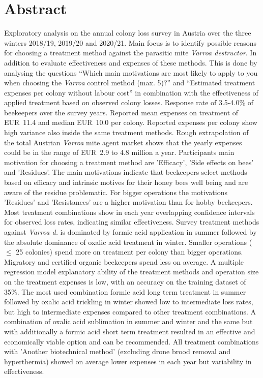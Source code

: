 \chapter*{Abstract}
\label{sec:abstract}
\vspace*{-15mm}

Exploratory analysis on the annual colony loss survey in Austria over the three winters 2018/19, 2019/20 and 2020/21. Main focus is to identify possible reasons for choosing a treatment method against the parasitic mite \textit{Varroa destructor}. In addition to evaluate effectiveness and expenses of these methods. This is done by analysing the questions \enquote{Which main motivations are most likely to apply to you when choosing the \textit{Varroa} control method (max. 5)?} and \enquote{Estimated treatment expenses per colony without labour cost} in combination with the effectiveness of applied treatment based on observed colony losses. Response rate of 3.5-4.0\% of beekeepers over the survey years. Reported mean expenses on treatment of EUR~11.4 and median EUR~10.0 per colony. Reported expenses per colony show high variance also inside the same treatment methods. Rough extrapolation of the total Austrian \textit{Varroa} mite agent market shows that the yearly expenses could be in the range of EUR~2.9 to 4.8 million a year. Participants main motivation for choosing a treatment method are 'Efficacy', 'Side effects on bees' and 'Residues'. The main motivations indicate that beekeepers select methods based on efficacy and intrinsic motives for their honey bees well being and are aware of the residue problematic. For bigger operations the motivations 'Residues' and 'Resistances' are a higher motivation than for hobby beekeepers. Most treatment combinations show in each year overlapping confidence intervals for observed loss rates, indicating similar effectiveness. Survey treatment methods against \textit{Varroa d.} is dominated by formic acid application in summer followed by the absolute dominance of oxalic acid treatment in winter. Smaller operations ($\leq$ 25 colonies) spend more on treatment per colony than bigger operations. Migratory and certified organic beekeepers spend less on average. A multiple regression model explanatory ability of the treatment methods and operation size on the treatment expenses is low, with an accuracy on the training dataset of 35\%. The most used combination formic acid long term treatment in summer followed by oxalic acid trickling in winter showed low to intermediate loss rates, but high to intermediate expenses compared to other treatment combinations. A combination of oxalic acid sublimation in summer and winter and the same but with additionally a formic acid short term treatment resulted in an effective and economically viable option and can be recommended. All treatment combinations with 'Another biotechnical method' (excluding drone brood removal and hyperthermia) showed on average lower expenses in each year but variability in effectiveness.

